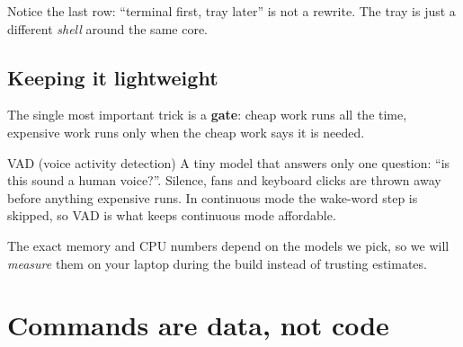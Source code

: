\documentclass[11pt,a4paper]{article}
\begin{document}
Notice the last row: ``terminal first, tray later'' is not a rewrite. The tray is just a
different \emph{shell} around the same core.

\subsection{Keeping it lightweight}
The single most important trick is a \textbf{gate}: cheap work runs all the time,
expensive work runs only when the cheap work says it is needed.

\begin{center}
\end{center}

\begin{concept}{VAD (voice activity detection)}
A tiny model that answers only one question: ``is this sound a human voice?''. Silence,
fans and keyboard clicks are thrown away before anything expensive runs. In continuous
mode the wake-word step is skipped, so VAD is what keeps continuous mode affordable.
\end{concept}

\noindent The exact memory and CPU numbers depend on the models we pick, so we will
\emph{measure} them on your laptop during the build instead of trusting estimates.

\section{Commands are data, not code}
\end{document}
